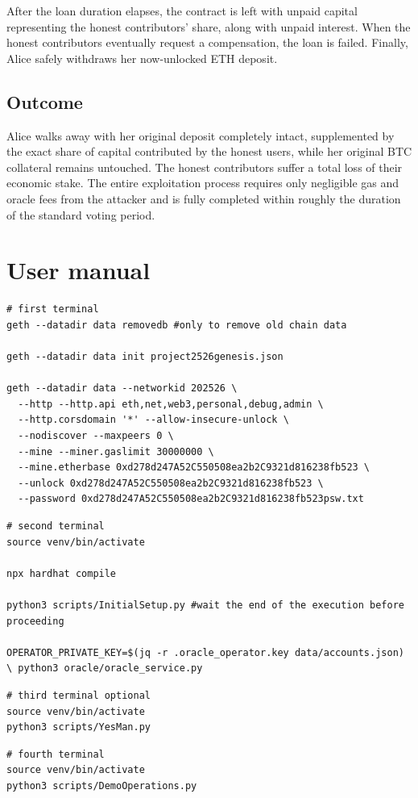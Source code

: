 \documentclass{report}
\begin{document}
After the loan duration elapses, the contract is left with unpaid capital representing the honest contributors' share, along with unpaid interest. When the honest contributors eventually request a compensation, the loan is failed. Finally, Alice safely withdraws her now-unlocked ETH deposit.

\subsection*{Outcome}
Alice walks away with her original deposit completely intact, supplemented by the exact share of capital contributed by the honest users, while her original BTC collateral remains untouched. The honest contributors suffer a total loss of their economic stake. The entire exploitation process requires only negligible gas and oracle fees from the attacker and is fully completed within roughly the duration of the standard voting period.

\section*{User manual}

\begin{lstlisting}[style=bashterm]
# first terminal
geth --datadir data removedb #only to remove old chain data

geth --datadir data init project2526genesis.json

geth --datadir data --networkid 202526 \
  --http --http.api eth,net,web3,personal,debug,admin \
  --http.corsdomain '*' --allow-insecure-unlock \
  --nodiscover --maxpeers 0 \
  --mine --miner.gaslimit 30000000 \
  --mine.etherbase 0xd278d247A52C550508ea2b2C9321d816238fb523 \
  --unlock 0xd278d247A52C550508ea2b2C9321d816238fb523 \
  --password 0xd278d247A52C550508ea2b2C9321d816238fb523psw.txt
\end{lstlisting}

\begin{lstlisting}[style=bashterm]
# second terminal
source venv/bin/activate

npx hardhat compile

python3 scripts/InitialSetup.py #wait the end of the execution before proceeding

OPERATOR_PRIVATE_KEY=$(jq -r .oracle_operator.key data/accounts.json) \ python3 oracle/oracle_service.py
\end{lstlisting}

\begin{lstlisting}[style=bashterm]
# third terminal optional
source venv/bin/activate
python3 scripts/YesMan.py

\end{lstlisting}

\begin{lstlisting}[style=bashterm]
# fourth terminal
source venv/bin/activate
python3 scripts/DemoOperations.py
\end{lstlisting}
\end{document}
